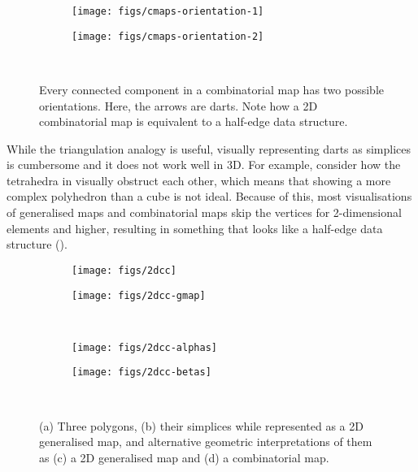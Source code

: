 \begin{figure}
\centering
\begin{subfigure}{0.33\linewidth}
\texttt{[image: figs/cmaps-orientation-1]}
\caption{}%
\label{subfig:cmaps-orientation-1}
\end{subfigure}%
\quad
\begin{subfigure}{0.33\linewidth}
\texttt{[image: figs/cmaps-orientation-2]}
\caption{}%
\label{subfig:cmaps-orientation-2}
\end{subfigure}\\
\caption{Every connected component in a combinatorial map has two possible orientations.
Here, the arrows are darts.
Note how a 2D combinatorial map is equivalent to a half-edge data structure.}%
\label{fig:cmaps-orientation}
\end{figure}

While the triangulation analogy is useful, visually representing darts as simplices is cumbersome and it does not work well in 3D.
For example, consider how the tetrahedra in  visually obstruct each other, which means that showing a more complex polyhedron than a cube is not ideal.
Because of this, most visualisations of generalised maps and combinatorial maps skip the vertices for 2-dimensional elements and higher, resulting in something that looks like a half-edge data structure ().

\begin{figure}
\centering
\begin{subfigure}{0.33\linewidth}
\texttt{[image: figs/2dcc]}
\caption{}%
\label{subfig:2dcc}
\end{subfigure}%
\quad
\begin{subfigure}{0.33\linewidth}
\texttt{[image: figs/2dcc-gmap]}
\caption{}%
\label{subfig:2dcc-gmap}
\end{subfigure}\\
\begin{subfigure}{0.33\linewidth}
\texttt{[image: figs/2dcc-alphas]}
\caption{}%
\label{subfig:2dcc-alphas}
\end{subfigure}%
\quad
\quad
\begin{subfigure}{0.33\linewidth}
\texttt{[image: figs/2dcc-betas]}
\caption{}%
\label{subfig:2dcc-betas}
\end{subfigure}\\
\caption{(a) Three polygons, (b) their simplices while represented as a 2D generalised map, and alternative geometric interpretations of them as (c) a 2D generalised map and (d) a combinatorial map.}%
\label{fig:2dcc}
\end{figure}

